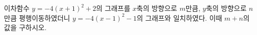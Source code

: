 이차함수 $y=-4(x+1)^2+2$의 그래프를 $x$축의 방향으로 $m$만큼, $y$축의 방향으로 $n$만큼 평행이동하였더니 $y=-4(x-1)^2-1$의 그래프와 일치하였다. 이때 $m+n$의 값을 구하시오.
